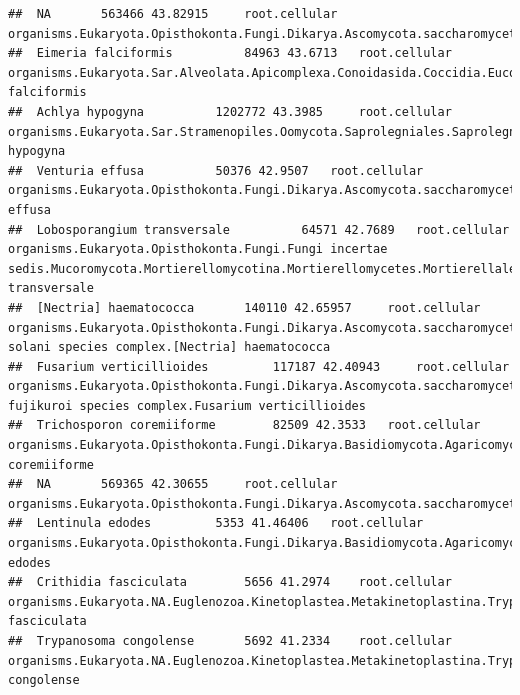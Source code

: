 \documentclass{article}\usepackage[]{graphicx}\usepackage[]{color}
\makeatletter
\newenvironment{kframe}{%
 \def\at@end@of@kframe{}%
 \ifinner\ifhmode%
  \def\at@end@of@kframe{\end{minipage}}%
  \begin{minipage}{\columnwidth}%
 \fi\fi%
 \def\FrameCommand##1{\hskip\@totalleftmargin \hskip-\fboxsep
 \colorbox{shadecolor}{##1}\hskip-\fboxsep
     \hskip-\linewidth \hskip-\@totalleftmargin \hskip\columnwidth}%
 \MakeFramed {\advance\hsize-\width
   \@totalleftmargin\z@ \linewidth\hsize
   \@setminipage}}%
 {\par\unskip\endMakeFramed%
 \at@end@of@kframe}
\newenvironment{knitrout}{}{} %
\makeatother
\begin{document}
\begin{knitrout}
\begin{kframe}
\begin{verbatim}
##  NA 		 563466 43.82915 	 root.cellular organisms.Eukaryota.Opisthokonta.Fungi.Dikarya.Ascomycota.saccharomyceta.Pezizomycotina.leotiomyceta.sordariomyceta.Sordariomycetes.Hypocreomycetidae.Microascales.Microascaceae.Scedosporium.NA
##  Eimeria falciformis 		 84963 43.6713 	 root.cellular organisms.Eukaryota.Sar.Alveolata.Apicomplexa.Conoidasida.Coccidia.Eucoccidiorida.Eimeriorina.Eimeriidae.Eimeria.Eimeria falciformis
##  Achlya hypogyna 		 1202772 43.3985 	 root.cellular organisms.Eukaryota.Sar.Stramenopiles.Oomycota.Saprolegniales.Saprolegniaceae.Achlya.Achlya hypogyna
##  Venturia effusa 		 50376 42.9507 	 root.cellular organisms.Eukaryota.Opisthokonta.Fungi.Dikarya.Ascomycota.saccharomyceta.Pezizomycotina.leotiomyceta.dothideomyceta.Dothideomycetes.Pleosporomycetidae.Venturiales.Venturiaceae.Venturia.Venturia effusa
##  Lobosporangium transversale 		 64571 42.7689 	 root.cellular organisms.Eukaryota.Opisthokonta.Fungi.Fungi incertae sedis.Mucoromycota.Mortierellomycotina.Mortierellomycetes.Mortierellales.Mortierellaceae.Lobosporangium.Lobosporangium transversale
##  [Nectria] haematococca 		 140110 42.65957 	 root.cellular organisms.Eukaryota.Opisthokonta.Fungi.Dikarya.Ascomycota.saccharomyceta.Pezizomycotina.leotiomyceta.sordariomyceta.Sordariomycetes.Hypocreomycetidae.Hypocreales.Nectriaceae.Fusarium.Fusarium solani species complex.[Nectria] haematococca
##  Fusarium verticillioides 		 117187 42.40943 	 root.cellular organisms.Eukaryota.Opisthokonta.Fungi.Dikarya.Ascomycota.saccharomyceta.Pezizomycotina.leotiomyceta.sordariomyceta.Sordariomycetes.Hypocreomycetidae.Hypocreales.Nectriaceae.Fusarium.Fusarium fujikuroi species complex.Fusarium verticillioides
##  Trichosporon coremiiforme 		 82509 42.3533 	 root.cellular organisms.Eukaryota.Opisthokonta.Fungi.Dikarya.Basidiomycota.Agaricomycotina.Tremellomycetes.Trichosporonales.NA.Trichosporon.Trichosporon coremiiforme
##  NA 		 569365 42.30655 	 root.cellular organisms.Eukaryota.Opisthokonta.Fungi.Dikarya.Ascomycota.saccharomyceta.Pezizomycotina.leotiomyceta.Eurotiomycetes.Chaetothyriomycetidae.Chaetothyriales.Herpotrichiellaceae.Cladophialophora.NA
##  Lentinula edodes 		 5353 41.46406 	 root.cellular organisms.Eukaryota.Opisthokonta.Fungi.Dikarya.Basidiomycota.Agaricomycotina.Agaricomycetes.Agaricomycetidae.Agaricales.Omphalotaceae.Lentinula.Lentinula edodes
##  Crithidia fasciculata 		 5656 41.2974 	 root.cellular organisms.Eukaryota.NA.Euglenozoa.Kinetoplastea.Metakinetoplastina.Trypanosomatida.Trypanosomatidae.Leishmaniinae.Crithidia.Crithidia fasciculata
##  Trypanosoma congolense 		 5692 41.2334 	 root.cellular organisms.Eukaryota.NA.Euglenozoa.Kinetoplastea.Metakinetoplastina.Trypanosomatida.Trypanosomatidae.Trypanosoma.Nannomonas.Trypanosoma congolense

\end{verbatim}
\end{kframe}
\end{knitrout}
\end{document}
